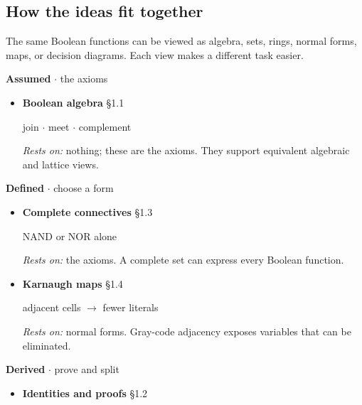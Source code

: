 \documentclass[11pt]{article}
\begin{document}
\begin{keepsection}
\section{How the ideas fit together}

The same Boolean functions can be viewed as algebra, sets, rings, normal forms, maps, or decision diagrams. Each view makes a different task easier.

\textbf{Assumed} \ensuremath{\cdot} the axioms

\begin{itemize}
\item {}
\textbf{Boolean algebra} \hfill{\small\color{FAUblue}§1.1}

join \ensuremath{\cdot} meet \ensuremath{\cdot} complement

\emph{Rests on:} nothing; these are the axioms. They support equivalent algebraic and lattice views.
\end{itemize}

\textbf{Defined} \ensuremath{\cdot} choose a form

\begin{itemize}
\item {}
\textbf{Complete connectives} \hfill{\small\color{FAUblue}§1.3}

NAND or NOR alone

\emph{Rests on:} the axioms. A complete set can express every Boolean function.
\item {}
\textbf{Karnaugh maps} \hfill{\small\color{FAUblue}§1.4}

adjacent cells \ensuremath{\to} fewer literals

\emph{Rests on:} normal forms. Gray-code adjacency exposes variables that can be eliminated.
\end{itemize}

\textbf{Derived} \ensuremath{\cdot} prove and split

\begin{itemize}
\item {}
\textbf{Identities and proofs} \hfill{\small\color{FAUblue}§1.2}


\end{itemize}
\end{keepsection}
\end{document}
